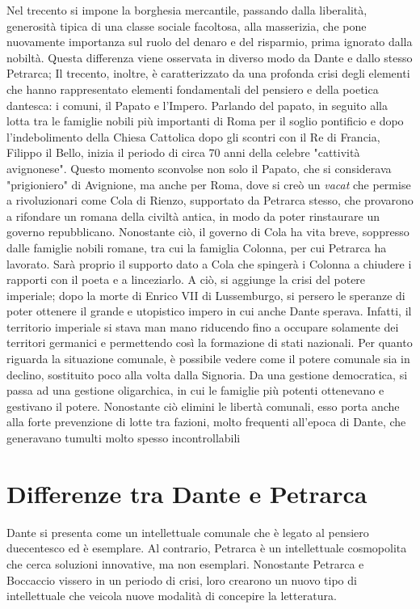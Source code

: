 \documentclass[10pt,a4paper]{article}
\begin{document}
Nel trecento si impone la borghesia mercantile, passando dalla liberalità, generosità tipica di una classe sociale facoltosa, alla masserizia, che pone nuovamente importanza sul ruolo del denaro e del risparmio, prima ignorato dalla nobiltà. Questa differenza viene osservata in diverso modo da Dante e dallo stesso Petrarca; Il trecento, inoltre, è caratterizzato da una profonda crisi degli elementi che hanno rappresentato elementi fondamentali del pensiero e della poetica dantesca: i comuni, il Papato e l'Impero. Parlando del papato, in seguito alla lotta tra le famiglie nobili più importanti di Roma per il soglio pontificio e dopo l'indebolimento della Chiesa Cattolica dopo gli scontri con il Re di Francia, Filippo il Bello, inizia il periodo di circa 70 anni della celebre "cattività avignonese". Questo momento sconvolse non solo il Papato, che si considerava "prigioniero" di Avignione, ma anche per Roma, dove si creò un \textit{vacat} che permise a rivoluzionari come Cola di Rienzo, supportato da Petrarca stesso, che provarono a rifondare un romana della civiltà antica, in modo da poter rinstaurare un governo repubblicano. Nonostante ciò, il governo di Cola ha vita breve, soppresso dalle famiglie nobili romane, tra cui la famiglia Colonna, per cui Petrarca ha lavorato. Sarà proprio il supporto dato a Cola che spingerà i Colonna a chiudere i rapporti con il poeta e a linceziarlo. A ciò, si aggiunge la crisi del potere imperiale; dopo la morte di Enrico VII di Lussemburgo, si persero le speranze di poter ottenere il grande e utopistico impero in cui anche Dante sperava. Infatti, il territorio imperiale si stava man mano riducendo fino a occupare solamente dei territori germanici e permettendo così la formazione di stati nazionali. Per quanto riguarda la situazione comunale, è possibile vedere come il potere comunale sia in declino, sostituito poco alla volta dalla Signoria. Da una gestione democratica, si passa ad una gestione oligarchica, in cui le famiglie più potenti ottenevano e gestivano il potere. Nonostante ciò elimini le libertà comunali, esso porta anche alla forte prevenzione di lotte tra fazioni, molto frequenti all'epoca di Dante, che generavano tumulti molto spesso incontrollabili  

\section{Differenze tra Dante e Petrarca}

Dante si presenta come un intellettuale comunale che è legato al pensiero duecentesco ed è esemplare. Al contrario, Petrarca è un intellettuale cosmopolita che cerca soluzioni innovative, ma non esemplari. Nonostante Petrarca e Boccaccio vissero in un periodo di crisi, loro crearono un nuovo tipo di intellettuale che veicola nuove modalità di concepire la letteratura.
\end{document}
